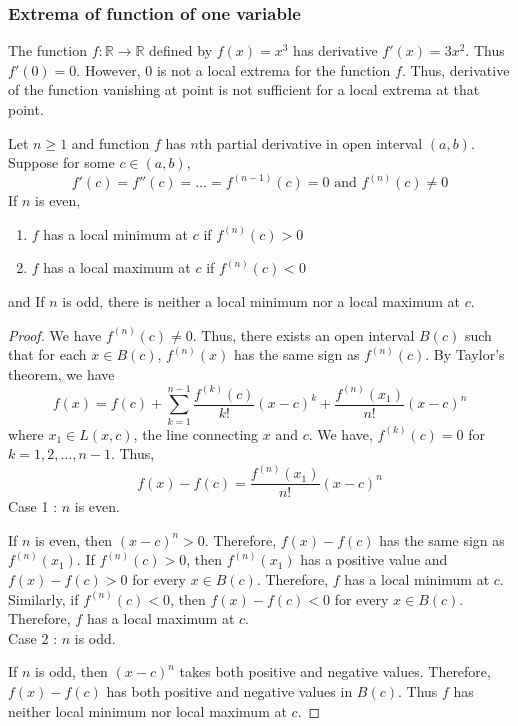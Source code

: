 \subsubsection{Extrema of function of one variable}
\begin{commentary}
	The function $f : \mathbb{R} \to \mathbb{R}$ defined by $f(x) = x^3$ has derivative $f'(x) = 3x^2$.
	Thus $f'(0) = 0$.
	However, $0$ is not a local extrema for the function $f$.
	Thus, derivative of the function vanishing at point is not sufficient for a local extrema at that point.
\end{commentary}
\begin{theorem}
	Let $n \ge 1$ and function $f$ has $n$th partial derivative in open interval $(a,b)$.
	Suppose for some $c \in (a,b)$,
	\[ f'(c) = f''(c) = \dots = f^{(n-1)}(c) = 0 \text{ and } f^{(n)}(c) \ne 0 \]
	If $n$ is even,
\begin{enumerate}
	\item $f$ has a local minimum at $c$ if $f^{(n)}(c)>0$
	\item $f$ has a local maximum at $c$ if $f^{(n)}(c) < 0$
\end{enumerate}
	and If $n$ is odd, there is neither a local minimum nor a local maximum at $c$.
\end{theorem}
\begin{proof}
	We have $f^{(n)}(c) \ne 0$.
	Thus, there exists an open interval $B(c)$ such that for each $x \in B(c)$, $f^{(n)}(x)$ has the same sign as $f^{(n)}(c)$.
	By Taylor's theorem, we have
	\begin{equation}
		f(x) = f(c) + \sum_{k = 1}^{n-1} \frac{f^{(k)}(c)}{k!}(x-c)^k + \frac{f^{(n)}(x_1)}{n!} (x-c)^n
	\end{equation}
	where $x_1 \in L(x,c)$, the line connecting $x$ and $c$.
	We have, $f^{(k)}(c) = 0$ for $k = 1,2,\dots,n-1$.
	Thus,
	\[ f(x)-f(c) = \frac{f^{(n)}(x_1)}{n!} (x-c)^n \]
	Case 1 : $n$ is even.

	If $n$ is even, then $(x-c)^n > 0$.
	Therefore, 
	$f(x)-f(c)$ has the same sign as $f^{(n)}(x_1)$.
	If $f^{(n)}(c) > 0$, then $f^{(n)}(x_1)$ has a positive value and $f(x)-f(c) > 0$ for every $x \in B(c)$.
	Therefore, $f$ has a local minimum at $c$.
	Similarly, if $f^{(n)}(c) < 0$, then $f(x)-f(c) < 0$ for every $x \in B(c)$.
	Therefore, $f$ has a local maximum at $c$.\\
	Case 2 : $n$ is odd.

	If $n$ is odd, then $(x-c)^n$ takes both positive and negative values.
	Therefore, $f(x) - f(c)$ has both positive and negative values in $B(c)$.
	Thus $f$ has neither local minimum nor local maximum at $c$.
\end{proof}

